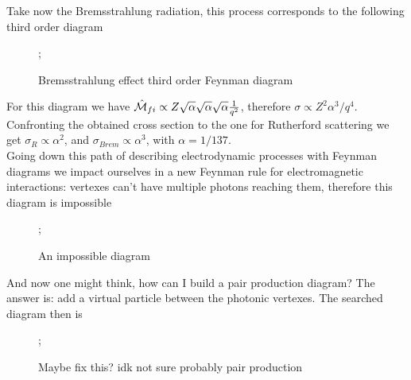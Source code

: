 \documentclass[../qm.tex]{subfiles}
\begin{document}
Take now the Bremsstrahlung radiation, this process corresponds to the following third order diagram
\begin{figure}[h!]
	\centering
	;
	\caption{Bremsstrahlung effect third order Feynman diagram}
	\label{fig:feynmandbremsstrahlung}
\end{figure}
For this diagram we have $\hat{\mathcal{M}}_{fi}\propto Z\sqrt{\alpha}\sqrt{\alpha}\sqrt{\alpha}\frac{1}{q^2}$, therefore $\sigma\propto Z^2\alpha^3/q^4$.\\
Confronting the obtained cross section to the one for Rutherford scattering we get $\sigma_R\propto\alpha^2$, and $\sigma_{Brem}\propto\alpha^3$, with $\alpha=1/137$.\\
Going down this path of describing electrodynamic processes with Feynman diagrams we impact ourselves in a new Feynman rule for electromagnetic interactions: vertexes can't have multiple photons reaching them, therefore this diagram is impossible
\begin{figure}[H]
	\centering
	;
	\caption{An impossible diagram}
	\label{fig:impossibleqed}
\end{figure}
And now one might think, how can I build a pair production diagram? The answer is: add a virtual particle between the photonic vertexes. The searched diagram then is
\begin{figure}[H]
	\centering
	;
%
	\caption{Maybe fix this? idk not sure probably pair production}
	\label{fig:pairproductionfdiag}
\end{figure}
\end{document}
